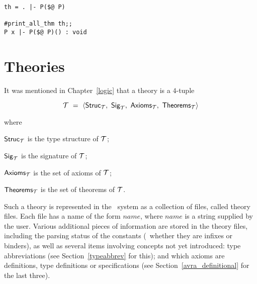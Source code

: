 {\setcounter{sessioncount}{1}
\begin{session}\begin{verbatim}
th = . |- P($@ P)

#print_all_thm th;;
P x |- P($@ P)() : void
\end{verbatim}\end{session}


\section{Theories}
\label{theoryfns}

It was mentioned in Chapter~\ref{logic} that a theory is a $4$-tuple

\[ {\cal T}\ =\ \langle{\sf Struc}_{\cal T},\ 
                {\sf Sig}_{\cal T},\ 
                {\sf Axioms}_{\cal T},\ 
                {\sf Theorems}_{\cal T}\rangle \]

\noindent where
\begin{myenumerate}
\item ${\sf Struc}_{\cal T}$ is
the type structure of ${\cal T}$;
\item ${\sf Sig}_{\cal T}$ is 
the signature of ${\cal T}$;
\item ${\sf Axioms}_{\cal T}$ is 
the set of axioms of ${\cal T}$;
\item ${\sf Theorems}_{\cal T}$ is the set of
theorems of ${\cal T}$.
\end{myenumerate}

Such a theory is represented  in the  \HOL\ system  as a  collection of files,
called theory files. Each  file has  a name  of the  form $name$, where
$name$ is a string supplied by the user.  Various additional pieces of
information are stored in the theory files, including the parsing status of the
constants (\ie\ whether they are infixes or binders), as well as several items
involving concepts not yet introduced: type abbreviations (see
Section~\ref{typeabbrev} for this); and which axioms are definitions, type
definitions or specifications (see Section~\ref{avra_definitional} for the last
three).

}
